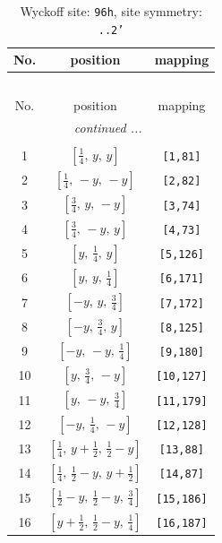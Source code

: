 \documentclass[fleqn,8pt]{jsarticle}
\begin{document}
\begin{longtable}{ccc}
\caption{Wyckoff site: {\tt 96h}, site symmetry: {\tt ..2'}}
 \\
 \hline \hline
No. & position & mapping \\ \hline \endfirsthead

\multicolumn{2}{l}{\tablename\ \thetable{}} \\
 \hline \hline
No. & position & mapping \\ \hline \endhead

 \hline \hline
\multicolumn{2}{r}{\footnotesize\it continued ...} \\ \endfoot

 \hline \hline
\multicolumn{2}{r}{} \\ \endlastfoot

1 & $\left[ \frac{1}{4},\, y,\, y \right]$ & {\tt [1,81]} \\ \hline
2 & $\left[ \frac{1}{4},\, - y,\, - y \right]$ & {\tt [2,82]} \\ \hline
3 & $\left[ \frac{3}{4},\, y,\, - y \right]$ & {\tt [3,74]} \\ \hline
4 & $\left[ \frac{3}{4},\, - y,\, y \right]$ & {\tt [4,73]} \\ \hline
5 & $\left[ y,\, \frac{1}{4},\, y \right]$ & {\tt [5,126]} \\ \hline
6 & $\left[ y,\, y,\, \frac{1}{4} \right]$ & {\tt [6,171]} \\ \hline
7 & $\left[ - y,\, y,\, \frac{3}{4} \right]$ & {\tt [7,172]} \\ \hline
8 & $\left[ - y,\, \frac{3}{4},\, y \right]$ & {\tt [8,125]} \\ \hline
9 & $\left[ - y,\, - y,\, \frac{1}{4} \right]$ & {\tt [9,180]} \\ \hline
10 & $\left[ y,\, \frac{3}{4},\, - y \right]$ & {\tt [10,127]} \\ \hline
11 & $\left[ y,\, - y,\, \frac{3}{4} \right]$ & {\tt [11,179]} \\ \hline
12 & $\left[ - y,\, \frac{1}{4},\, - y \right]$ & {\tt [12,128]} \\ \hline
13 & $\left[ \frac{1}{4},\, y + \frac{1}{2},\, \frac{1}{2} - y \right]$ & {\tt [13,88]} \\ \hline
14 & $\left[ \frac{1}{4},\, \frac{1}{2} - y,\, y + \frac{1}{2} \right]$ & {\tt [14,87]} \\ \hline
15 & $\left[ \frac{1}{2} - y,\, \frac{1}{2} - y,\, \frac{3}{4} \right]$ & {\tt [15,186]} \\ \hline
16 & $\left[ y + \frac{1}{2},\, \frac{1}{2} - y,\, \frac{1}{4} \right]$ & {\tt [16,187]} \\ \hline

\end{longtable}
\end{document}
